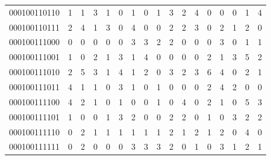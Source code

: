 \documentclass[10pt,a4paper]{article}
\begin{document}
\begin{longtable}{ |c|c|c|c|c|c|c|c|c|c|c|c|c|c|c|c|c| }
    000100110110              & 1                            & 1                                & 3                            & 1                              & 0   & 1   & 0   & 1   & 3   & 2   & 4   & 0   & 0   & 0   & 1   & 4   \\
    000100110111              & 2                            & 4                                & 1                            & 3                              & 0   & 4   & 0   & 0   & 2   & 2   & 3   & 0   & 2   & 1   & 2   & 0   \\
    000100111000              & 0                            & 0                                & 0                            & 0                              & 0   & 3   & 3   & 2   & 2   & 0   & 0   & 0   & 3   & 0   & 1   & 1   \\
    000100111001              & 1                            & 0                                & 2                            & 1                              & 3   & 1   & 4   & 0   & 0   & 0   & 0   & 2   & 1   & 3   & 5   & 2   \\
    000100111010              & 2                            & 5                                & 3                            & 1                              & 4   & 1   & 2   & 0   & 3   & 2   & 3   & 6   & 4   & 0   & 2   & 1   \\
    000100111011              & 4                            & 1                                & 1                            & 0                              & 3   & 1   & 0   & 1   & 0   & 0   & 0   & 2   & 4   & 2   & 0   & 0   \\
    000100111100              & 4                            & 2                                & 1                            & 0                              & 1   & 0   & 0   & 1   & 0   & 4   & 0   & 2   & 1   & 0   & 5   & 3   \\
    000100111101              & 1                            & 0                                & 0                            & 1                              & 3   & 2   & 0   & 0   & 2   & 2   & 0   & 1   & 0   & 3   & 2   & 2   \\
    000100111110              & 0                            & 2                                & 1                            & 1                              & 1   & 1   & 1   & 1   & 2   & 1   & 2   & 1   & 2   & 0   & 4   & 0   \\
    000100111111              & 0                            & 2                                & 0                            & 0                              & 0   & 3   & 3   & 3   & 2   & 0   & 1   & 0   & 3   & 1   & 2   & 1   \\

\end{longtable}
\end{document}
